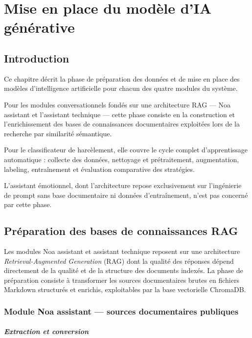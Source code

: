 \chapter{Mise en place du modèle d'IA générative}

\section*{Introduction}

Ce chapitre décrit la phase de préparation des données et de mise en place
des modèles d'intelligence artificielle pour chacun des quatre modules du système.

Pour les modules conversationnels fondés sur une architecture RAG —
Noa assistant et l'assistant technique — cette phase consiste en la construction
et l'enrichissement des bases de connaissances documentaires exploitées
lors de la recherche par similarité sémantique.

Pour le classificateur de harcèlement, elle couvre le cycle complet
d'apprentissage automatique : collecte des données, nettoyage et prétraitement,
augmentation, labeling, entraînement et évaluation comparative des stratégies.

L'assistant émotionnel, dont l'architecture repose exclusivement sur
l'ingénierie de prompt sans base documentaire ni données d'entraînement,
n'est pas concerné par cette phase.

\section{Préparation des bases de connaissances RAG}

Les modules Noa assistant et assistant technique reposent sur une architecture
\textit{Retrieval-Augmented Generation} (RAG) dont la qualité des réponses
dépend directement de la qualité et de la structure des documents indexés.
La phase de préparation consiste à transformer les sources documentaires brutes
en fichiers Markdown structurés et enrichis, exploitables par la base
vectorielle ChromaDB.

\subsection{Module Noa assistant — sources documentaires publiques}

\paragraph{Extraction et conversion}\mbox{}\newline

